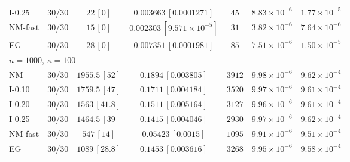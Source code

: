 \begin{tabular}{lcccccc}
I-0.25 & 30/30 & $22\, [0]$ & $0.003663\, [0.0001271]$ & $45$ & $8.83\times10^{-6}$ & $1.77\times10^{-5}$ \\
NM-fast & 30/30 & $15\, [0]$ & $0.002303\, [9.571\times10^{-5}]$ & $31$ & $3.82\times10^{-6}$ & $7.64\times10^{-6}$ \\
EG & 30/30 & $28\, [0]$ & $0.007351\, [0.0001981]$ & $85$ & $7.51\times10^{-6}$ & $1.50\times10^{-5}$ \\
\midrule
\multicolumn{7}{l}{$n=1000$, $\kappa=100$} \\
NM & 30/30 & $1955.5\, [52]$ & $0.1894\, [0.003805]$ & $3912$ & $9.98\times10^{-6}$ & $9.62\times10^{-4}$ \\
I-0.10 & 30/30 & $1759.5\, [47]$ & $0.1711\, [0.004184]$ & $3520$ & $9.97\times10^{-6}$ & $9.61\times10^{-4}$ \\
I-0.20 & 30/30 & $1563\, [41.8]$ & $0.1511\, [0.005164]$ & $3127$ & $9.96\times10^{-6}$ & $9.61\times10^{-4}$ \\
I-0.25 & 30/30 & $1464.5\, [39]$ & $0.1415\, [0.004046]$ & $2930$ & $9.97\times10^{-6}$ & $9.62\times10^{-4}$ \\
NM-fast & 30/30 & $547\, [14]$ & $0.05423\, [0.0015]$ & $1095$ & $9.91\times10^{-6}$ & $9.51\times10^{-4}$ \\
EG & 30/30 & $1089\, [28.8]$ & $0.1453\, [0.003616]$ & $3268$ & $9.95\times10^{-6}$ & $9.58\times10^{-4}$ \\
\bottomrule
\end{tabular}
